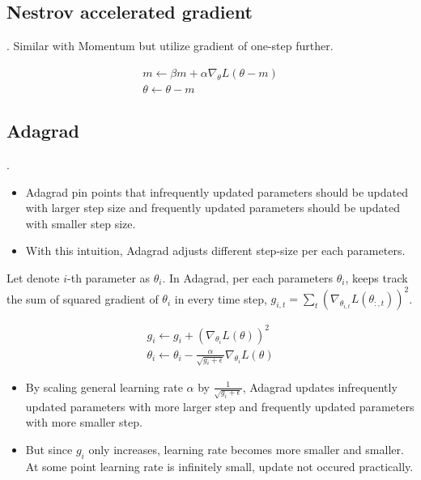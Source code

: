 \documentclass[8pt]{beamer}
\begin{document}
\subsection{Nestrov accelerated gradient}
\begin{frame}{.}
    Similar with Momentum but utilize gradient of one-step further.

    \[
    \begin{gathered}
        m \leftarrow \beta m + \alpha \nabla_\theta L(\theta - m) \\
        \theta \leftarrow \theta - m
    \end{gathered}
    \]

\end{frame}

\subsection{Adagrad}
\begin{frame}{.}
    \begin{itemize}
        \item Adagrad pin points that infrequently updated parameters should be updated with larger step size and frequently updated parameters should be updated with smaller step size.
        \item With this intuition, Adagrad adjusts different step-size per each parameters.
    \end{itemize}

    Let denote $i$-th parameter as $\theta_{i}$. In Adagrad, per each parameters $\theta_i$, keeps track the sum of squared gradient of $\theta_{i}$ in every time step, $g_{i, t} = \sum_t (\nabla_{\theta_{i,t}} L(\theta_{:, t}))^2 $.

    \[
        \begin{gathered}
            g_{i} \leftarrow g_{i} + (\nabla_{\theta_{i}} L(\theta))^2 \\
            \theta_i \leftarrow \theta_i - \frac{\alpha}{\sqrt{g_i + \epsilon}} \nabla_{\theta_i} L(\theta)
        \end{gathered}
    \]

    \begin{itemize}
        \item By scaling general learning rate $\alpha$ by $\frac{1}{\sqrt{g_i + \epsilon}}$, Adagrad updates infrequently updated parameters with more larger step and frequently updated parameters with more smaller step.
        \item But since $g_i$ only increases, learning rate becomes more smaller and smaller. At some point learning rate is infinitely small, update not occured practically.
    \end{itemize}
\end{frame}
\end{document}

